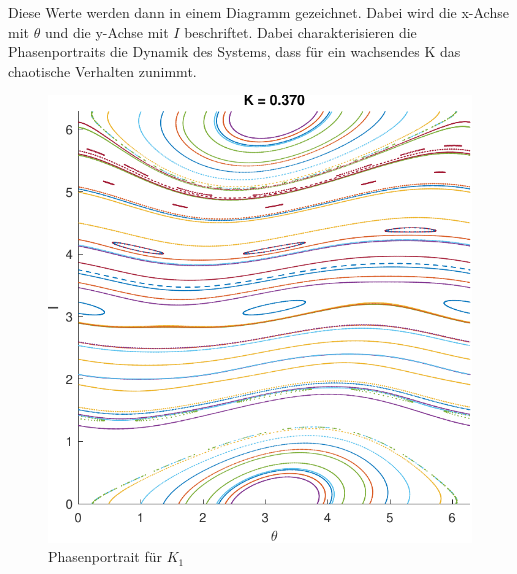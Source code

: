 \documentclass[paper=a4, 
                DIV=12]{scrartcl}
\begin{document}
Diese Werte werden dann in einem Diagramm gezeichnet. Dabei wird die x-Achse mit $\theta$ und die y-Achse mit $I$ beschriftet.
\newpage
\noindent Dabei charakterisieren die Phasenportraits die Dynamik des Systems, dass für ein wachsendes K das chaotische Verhalten zunimmt. \\
\begin{figure}[H]
    \centering
    \begin{minipage}[t]{0.48\textwidth}
        \centering
        \includegraphics[height=0.33\textheight]{phasenportrait_k1.pdf}
        \caption{Phasenportrait für $K_1$}
    \end{minipage}
    \hfill
    \begin{minipage}[t]{0.48\textwidth}
        \centering

\end{minipage}
\end{figure}
\end{document}
